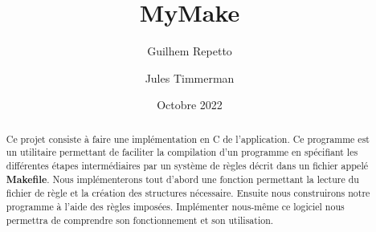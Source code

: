 \documentclass[11pt]{article}
\title{MyMake}
\date{Octobre 2022}
\author{Guilhem Repetto \and Jules Timmerman}
\begin{document}
\maketitle

\begin{abstract}
Ce projet consiste à faire une implémentation en C de l'application.
Ce programme est un utilitaire permettant de faciliter la compilation d'un programme en spécifiant les différentes étapes intermédiaires par un système de règles décrit dans un fichier appelé \textbf{Makefile}.
Nous implémenterons tout d'abord une fonction permettant la lecture du fichier de règle et la création des structures nécessaire. Ensuite nous construirons notre programme à l'aide des règles imposées.
Implémenter nous-même ce logiciel nous permettra de comprendre son fonctionnement et son utilisation.

\end{abstract}
\end{document}
